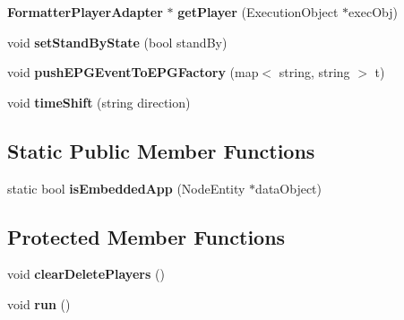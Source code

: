 \begin{CompactItemize}
\item 
{\bf FormatterPlayerAdapter} $\ast$ \textbf{getPlayer} (ExecutionObject $\ast$execObj)\label{classbr_1_1pucrio_1_1telemidia_1_1ginga_1_1ncl_1_1adapters_1_1PlayerAdapterManager_e791d3d39404def36c23676f2368ebee}

\item 
void \textbf{setStandByState} (bool standBy)\label{classbr_1_1pucrio_1_1telemidia_1_1ginga_1_1ncl_1_1adapters_1_1PlayerAdapterManager_ec91d5450ec8c5bd48870cb2e1f5596f}

\item 
void \textbf{pushEPGEventToEPGFactory} (map$<$ string, string $>$ t)\label{classbr_1_1pucrio_1_1telemidia_1_1ginga_1_1ncl_1_1adapters_1_1PlayerAdapterManager_03f0f1e577dc80fc2e776c470579b17c}

\item 
void \textbf{timeShift} (string direction)\label{classbr_1_1pucrio_1_1telemidia_1_1ginga_1_1ncl_1_1adapters_1_1PlayerAdapterManager_4c957efac0cbe36537ad4b97184298dc}

\end{CompactItemize}
\subsection*{Static Public Member Functions}
\begin{CompactItemize}
\item 
static bool \textbf{isEmbeddedApp} (NodeEntity $\ast$dataObject)\label{classbr_1_1pucrio_1_1telemidia_1_1ginga_1_1ncl_1_1adapters_1_1PlayerAdapterManager_0345b9e3ae604e7e6cc760c4d9291610}

\end{CompactItemize}
\subsection*{Protected Member Functions}
\begin{CompactItemize}
\item 
void \textbf{clearDeletePlayers} ()\label{classbr_1_1pucrio_1_1telemidia_1_1ginga_1_1ncl_1_1adapters_1_1PlayerAdapterManager_94e06c1be09db595271be4c1f2ef8379}

\item 
void \textbf{run} ()\label{classbr_1_1pucrio_1_1telemidia_1_1ginga_1_1ncl_1_1adapters_1_1PlayerAdapterManager_13a43e6d814de94978c515cb084873b1}

\end{CompactItemize}
